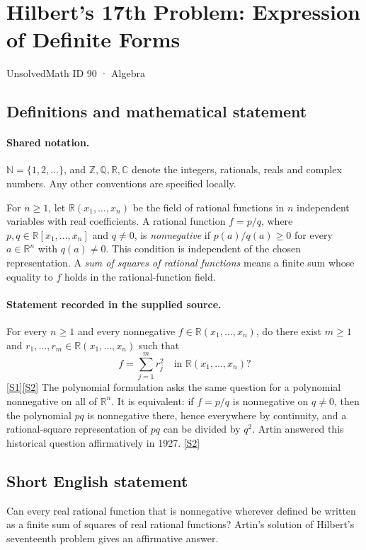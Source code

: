 \documentclass[11pt]{article}
\newcommand{\sref}[2]{\hyperlink{source:#1:#2}{[S#2]}}
\begin{document}
\setcounter{section}{89}
\section{Hilbert's 17th Problem: Expression of Definite Forms}\label{90}
{\small\sffamily UnsolvedMath ID 90 · Algebra}
\subsection{Definitions and mathematical statement}

\paragraph{Shared notation.}$\mathbb N=\{1,2,\ldots\}$, and $\mathbb Z,\mathbb Q,\mathbb R,\mathbb C$ denote the integers, rationals, reals and complex numbers. Any other conventions are specified locally.


For $n\ge1$, let $\mathbb R(x_1,\ldots,x_n)$ be the field of rational functions in $n$ independent variables with real coefficients. A rational function $f=p/q$, where $p,q\in\mathbb R[x_1,\ldots,x_n]$ and $q\ne0$, is \emph{nonnegative} if $p(a)/q(a)\ge0$ for every $a\in\mathbb R^n$ with $q(a)\ne0$. This condition is independent of the chosen representation. A \emph{sum of squares of rational functions} means a finite sum whose equality to $f$ holds in the rational-function field.
\paragraph{Statement recorded in the supplied source.}
For every $n\ge1$ and every nonnegative $f\in\mathbb R(x_1,\ldots,x_n)$, do there exist $m\ge1$ and $r_1,\ldots,r_m\in\mathbb R(x_1,\ldots,x_n)$ such that
\[
f=\sum_{j=1}^{m}r_j^2\quad\text{in }\mathbb R(x_1,\ldots,x_n)?
\]
\sref{90}{1}\sref{90}{2}
The polynomial formulation asks the same question for a polynomial nonnegative on all of $\mathbb R^n$. It is equivalent: if $f=p/q$ is nonnegative on $q\ne0$, then the polynomial $pq$ is nonnegative there, hence everywhere by continuity, and a rational-square representation of $pq$ can be divided by $q^2$. Artin answered this historical question affirmatively in 1927. \sref{90}{2}
\subsection{Short English statement}
Can every real rational function that is nonnegative wherever defined be written as a finite sum of squares of real rational functions? Artin's solution of Hilbert's seventeenth problem gives an affirmative answer.
\end{document}
